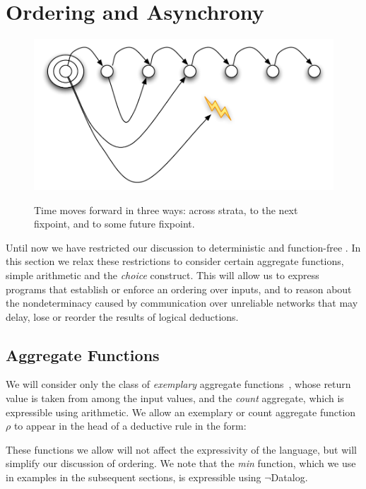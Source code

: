 \section{Ordering and Asynchrony}

\begin{figure}[t]
  \centering
  \includegraphics[width=0.75\linewidth]{dedalus-time.pdf}
  \label{fig:dedalus-time}
  \caption{Time moves forward in three ways: across strata, to the next fixpoint, and to some future fixpoint.}
\vspace{-8pt}
\end{figure}

Until now we have restricted our discussion to deterministic and function-free \lang.  In this section
we relax these restrictions to consider certain aggregate functions, simple arithmetic and the \emph{choice} construct.  
This will allow us to express programs that establish or enforce an ordering over inputs, and to reason about
the nondeterminacy caused by communication over unreliable networks that may delay, lose or reorder the
results of logical deductions.

\subsection{Aggregate Functions}

We will consider only the class of \emph{exemplary} aggregate functions~\cite{tag}, whose return value
is taken from among the input values, and the \emph{count} aggregate, which is expressible using arithmetic.  
We allow an exemplary or count aggregate function $\rho$ to appear in the head of a deductive rule
in the form:


These functions we allow will not affect the expressivity of the language, but will simplify our discussion of 
ordering.  We note that the \emph{min} function, which we use in examples in the subsequent sections,
is expressible using $\lnot$Datalog.

